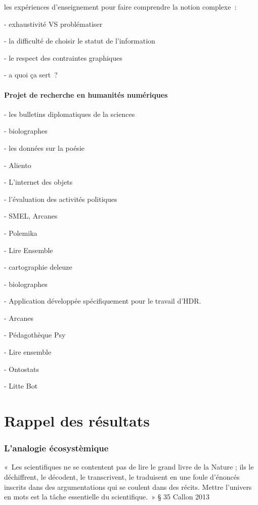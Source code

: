 \documentclass[
  letterpaper,
  DIV=11,
  numbers=noendperiod]{scrreprt}
\begin{document}
les expériences d'enseignement pour faire comprendre la notion
complexe~:

- exhaustivité VS problématiser

- la difficulté de choisir le statut de l'information

- le respect des contraintes graphiques

- a quoi ça sert~?

\hypertarget{projet-de-recherche-en-humanituxe9s-numuxe9riques}{%
\subsubsection{Projet de recherche en humanités
numériques}\label{projet-de-recherche-en-humanituxe9s-numuxe9riques}}

- les bulletins diplomatiques de la sciences

- biolographes

- les données sur la poésie

- Aliento

- L'internet des objets

- l'évaluation des activités politiques

- SMEL, Arcanes

- Polemika

- Lire Ensemble

- cartographie deleuze

- biolographes

- Application développée spécifiquement pour le travail d'HDR.

- Arcanes

- Pédagothèque Psy

- Lire ensemble

- Ontostats

- Litte Bot

\hypertarget{sec-resultats}{%
\chapter{Rappel des résultats}\label{sec-resultats}}

\hypertarget{sec-analogieEcosysteme}{%
\subsection{L'analogie écosystèmique}\label{sec-analogieEcosysteme}}

«~Les scientifiques ne se contentent pas de lire le grand livre de la
Nature ; ils le déchiffrent, le décodent, le transcrivent, le traduisent
en une foule d'énoncés inscrits dans des argumentations qui se coulent
dans des récits. Mettre l'univers en mots est la tâche essentielle du
scientifique.~» § 35 Callon 2013
\end{document}

